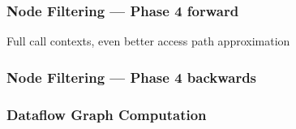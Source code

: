 \subsubsection*{Node Filtering --- Phase 4 forward}
Full call contexts, even better access path approximation 
\subsubsection*{Node Filtering --- Phase 4 backwards}

\subsubsection*{Dataflow Graph Computation}











